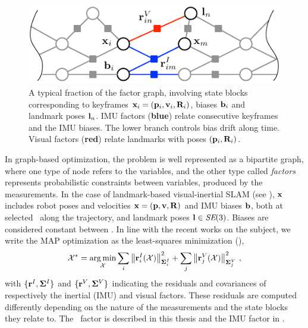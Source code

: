 \begin{figure}
    \centering
    \includegraphics[scale=1.3]{figures/absolute/graph}
    \caption{A typical fraction of the factor graph, involving state blocks corresponding to keyframes ${\bf x}_i=({\bf p}_i,{\bf v}_i,{\bf R}_i)$, biases ${\bf b}_i$ and landmark poses ${\bf l}_n$. 
    IMU factors (\textbf{blue}) relate consecutive keyframes and the IMU biases.
    The lower branch controls bias drift along time.
    Visual factors (\textbf{red}) relate landmarks with poses $({\bf p}_i,{\bf R}_i)$.}
    \label{fig:VI_factor_graph}
\end{figure}

In graph-based optimization, the problem is well represented as a bipartite graph, where one type of node refers to the variables, 
and the other type called \emph{factors} represents probabilistic constraints between variables, produced by the measurements.
%
In the case of landmark-based visual-inertial SLAM (see ), ${\bf x}$ includes robot poses and velocities 
${\bf x}=({\bf p},{\bf v},{\bf R})$ and IMU biases ${\bf b}$, both at selected \keyframes\ along the trajectory, and landmark poses ${\bf l} \in \textit{SE}(3)$.
Biases are considered constant between \keyframes.
%
In line with the recent works on the subject, we write the MAP optimization as the least-squares minimization (),
%
\begin{align}\label{equ:least_squares}
    \mathcal{X}^* = \operatorname*{arg\,min}_{\mathcal{X}} 
    \sum_i {\left\|{\bf r}^I_i(\mathcal{X})\right\|}_{{\bm \Sigma}^I_i}^2
    +
    \sum_j {\left\|{\bf r}^V_j(\mathcal{X})\right\|}_{{\bm \Sigma}^V_j}^2
~,
\end{align}
%
with $\{{\bf r}^I,{\bm \Sigma}^I\}$ and $\{{\bf r}^V,{\bm \Sigma}^V\}$ indicating the residuals and covariances of respectively the inertial (IMU) and visual factors.
These residuals are computed differently depending on the nature of the measurements and the state blocks they relate to. 
The \apriltag\ factor is described in this thesis  and the IMU factor in .


